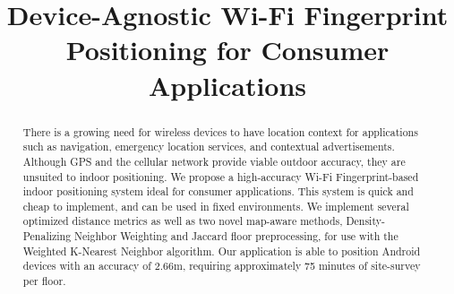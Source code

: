 \documentclass[conference]{IEEEtran}
\begin{document}
\title{Device-Agnostic Wi-Fi Fingerprint Positioning for Consumer Applications}

\author{
\and
{}
\and
{}
\and
{}
}

\maketitle

\begin{abstract}
There is a growing need for wireless devices to have location context for applications such as navigation, emergency location services, and contextual advertisements. Although GPS and the cellular network provide viable outdoor accuracy, they are unsuited to indoor positioning. We propose a high-accuracy Wi-Fi Fingerprint-based indoor positioning system ideal for consumer applications. This system is quick and cheap to implement, and can be used in fixed environments. We implement several optimized distance metrics as well as two novel map-aware methods, Density-Penalizing Neighbor Weighting and Jaccard floor preprocessing, for use with the Weighted K-Nearest Neighbor algorithm. Our application is able to position Android devices with an accuracy of 2.66m, requiring approximately 75 minutes of site-survey per floor.
\end{abstract}

\IEEEpeerreviewmaketitle
\end{document}
